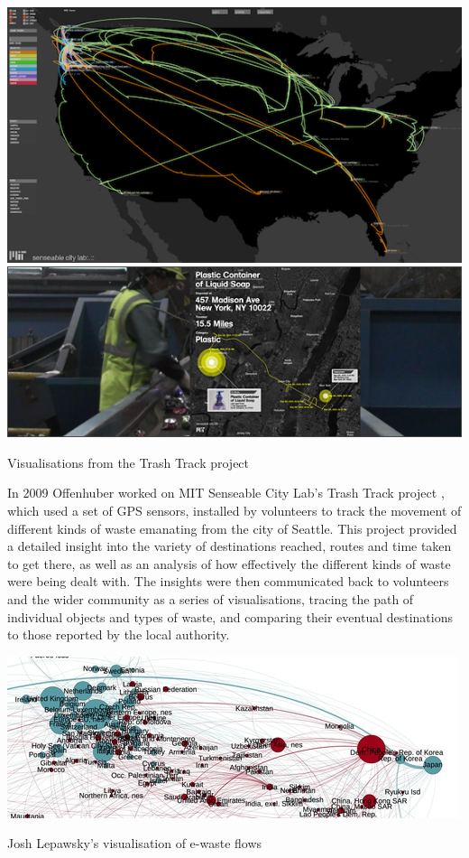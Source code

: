 \documentclass[nofonts,nols,justified,nobib]{tufte-book}
\begin{document}
\begin{marginfigure}
\includegraphics[width=\textwidth]{img/1/trashtrack1.png}\\
\vspace{0.5cm}
\includegraphics[width=\textwidth]{img/1/trashtrack2.jpg}
\caption{Visualisations from the Trash Track project \cite{ratti_trash_2009}}
\end{marginfigure}

In 2009 Offenhuber worked on MIT Senseable City Lab's Trash Track project \cite{ratti_trash_2009}, which used a set of GPS sensors, installed by volunteers to track the movement of different kinds of waste emanating from the city of Seattle. This project provided a detailed insight into the variety of destinations reached, routes and time taken to get there, as well as an analysis of how effectively the different kinds of waste were being dealt with. The insights were then communicated back to volunteers and the wider community as a series of visualisations, tracing the path of individual objects and types of waste, and comparing their eventual destinations to those reported by the local authority.

\begin{marginfigure}
\includegraphics[width=\textwidth]{img/1/lepwasky-ewaste-flows-2012.jpg}
\caption{Josh Lepawsky's visualisation of e-waste flows}
\end{marginfigure}
\end{document}
